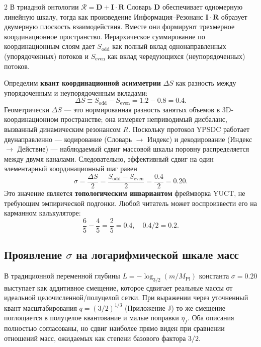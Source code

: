\documentclass[11pt,a4paper]{article}
\begin{document}
\begin{multicols}{2}
		В триадной онтологии \(\mathcal{R} = \mathbf{D} + \mathbf{I}\!\cdot\!\mathbf{R}\) Словарь \(\mathbf{D}\) обеспечивает одномерную линейную шкалу, тогда как произведение Информация–Резонанс \(\mathbf{I}\!\cdot\!\mathbf{R}\) образует двумерную плоскость взаимодействия. Вместе они формируют трехмерное координационное пространство. Иерархическое суммирование по координационным слоям дает \(S_{\mathrm{odd}}\) как полный вклад однонаправленных (упорядоченных) потоков и \(S_{\mathrm{even}}\) как вклад чередующихся (неупорядоченных) потоков.
		
		Определим \textbf{квант координационной асимметрии} \(\Delta S\) как разность между упорядоченным и неупорядоченным вкладами:
		\begin{equation}
			\Delta S \equiv S_{\mathrm{odd}} - S_{\mathrm{even}} = 1.2 - 0.8 = 0.4.
			\label{eq:Deltas}
		\end{equation}
		Геометрически \(\Delta S\) — это нормированная разность занятых объемов в 3D-координационном пространстве; она измеряет неприводимый дисбаланс, вызванный динамическим резонансом \(R\). Поскольку протокол YPSDC работает двунаправленно — кодирование (Словарь $\to$ Индекс) и декодирование (Индекс $\to$ Действие) — наблюдаемый сдвиг массовой шкалы поровну распределяется между двумя каналами. Следовательно, эффективный сдвиг на один элементарный координационный шаг равен
		\begin{equation}
			\boxed{\sigma = \frac{\Delta S}{2} = \frac{S_{\mathrm{odd}} - S_{\mathrm{even}}}{2} = \frac{0.4}{2} = 0.20.}
			\label{eq:sigma}
		\end{equation}
		Это значение является \textbf{топологическим инвариантом} фреймворка YUCT, не требующим эмпирической подгонки. Любой читатель может воспроизвести его на карманном калькуляторе:
		\[
		\frac{6}{5} - \frac{4}{5} = \frac{2}{5} = 0.4,\quad 0.4 / 2 = 0.2.
		\]
		
		\subsection{Проявление \(\sigma\) на логарифмической шкале масс}
		
		В традиционной переменной глубины \(L = -\log_{3/2}(m/M_{\mathrm{Pl}})\) константа \(\sigma = 0.20\) выступает как аддитивное смещение, которое сдвигает реальные массы от идеальной целочисленной/полуцелой сетки. При выражении через уточненный квант масштабирования \(q = (3/2)^{1/3}\) (Приложение J) то же смещение поглощается в полуцелое квантование и малые поправки \(\eta_f\). Оба описания полностью согласованы, но сдвиг наиболее прямо виден при сравнении отношений масс, ожидаемых как степени базового фактора \(3/2\).
		

\end{multicols}
\end{document}
